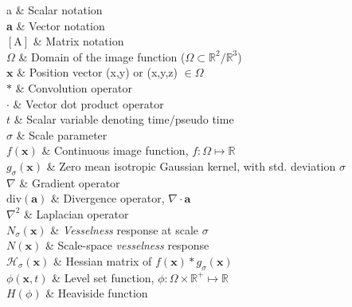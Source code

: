\documentclass[12pt, oneside]{Thesis} %
\begin{document}
{
a & Scalar notation \\

\textbf{a} & Vector notation \\

$\left[\text{A}\right]$ & Matrix notation \\

$\Omega$ & Domain of the image function ($\Omega\subset \mathbb{R}^2/\mathbb{R}^3$) \\

$\textbf{x}$ & Position vector (x,y) or (x,y,z) $\in \Omega$  \\

$\ast$ & Convolution operator \\

$\cdot$ & Vector dot product operator \\

$t$ & Scalar variable denoting time/pseudo time \\

$\sigma$ & Scale parameter \\

$f(\textbf{x})$ & Continuous image function,  $f:\Omega \mapsto \mathbb{R}$ \\

$g_\sigma(\textbf{x})$ & Zero mean isotropic Gaussian kernel, with std. deviation $\sigma$  \\

$\nabla$ & Gradient operator \\

$ \text{div}(\textbf{a})$ & Divergence operator, $\nabla\cdot\textbf{a}$ \\

$\nabla^2$ & Laplacian operator \\

$N_\sigma(\textbf{x})$ & \textit{Vesselness} response at scale $\sigma$ \\

$N(\textbf{x})$ & Scale-space \textit{vesselness} response \\

$\mathcal{H}_\sigma(\textbf{x})$ & Hessian matrix of $f(\textbf{x})\ast g_\sigma(\textbf{x})$\\

$\phi(\textbf{x},t)$ & Level set function, $\phi: \Omega\times \mathbb{R}^+\mapsto \mathbb{R} $ \\

$H(\phi)$ & Heaviside function\\

}
\end{document}
